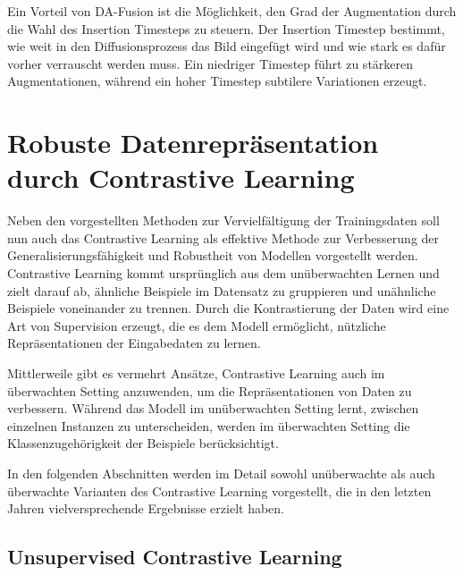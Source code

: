 Ein Vorteil von DA-Fusion ist die Möglichkeit, den Grad der Augmentation durch die Wahl des Insertion Timesteps zu steuern. Der Insertion Timestep bestimmt, wie weit in den Diffusionsprozess das Bild eingefügt wird und wie stark es dafür vorher verrauscht werden muss. Ein niedriger Timestep führt zu stärkeren Augmentationen, während ein hoher Timestep subtilere Variationen erzeugt.



\section{Robuste Datenrepräsentation durch Contrastive Learning} \label{sec-contrastive-learning}

Neben den vorgestellten Methoden zur Vervielfältigung der Trainingsdaten soll nun auch das Contrastive Learning als effektive Methode zur Verbesserung der Generalisierungsfähigkeit und Robustheit von Modellen vorgestellt werden. Contrastive Learning kommt ursprünglich aus dem unüberwachten Lernen und zielt darauf ab, ähnliche Beispiele im Datensatz zu gruppieren und unähnliche Beispiele voneinander zu trennen. Durch die Kontrastierung der Daten wird eine Art von Supervision erzeugt, die es dem Modell ermöglicht, nützliche Repräsentationen der Eingabedaten zu lernen.

Mittlerweile gibt es vermehrt Ansätze, Contrastive Learning auch im überwachten Setting anzuwenden, um die Repräsentationen von Daten zu verbessern. Während das Modell im unüberwachten Setting lernt, zwischen einzelnen Instanzen zu unterscheiden, werden im überwachten Setting die Klassenzugehörigkeit der Beispiele berücksichtigt.

In den folgenden Abschnitten werden im Detail sowohl unüberwachte als auch überwachte Varianten des Contrastive Learning vorgestellt, die in den letzten Jahren vielversprechende Ergebnisse erzielt haben.

\subsection{Unsupervised Contrastive Learning} \label{subsec-unsup-contrastive}

